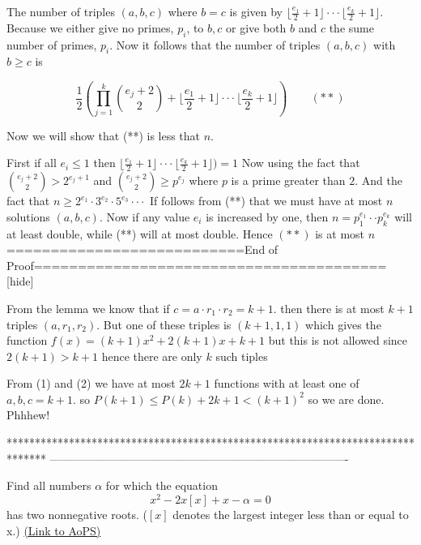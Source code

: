 \begin{solution}
The number of triples $(a,b,c)$ where $b=c$ is given by $\lfloor\frac{e_1}{2}+1\rfloor\cdot\cdot\cdot \lfloor\frac{e_k}{2}+1 \rfloor$. Because we either give no primes, $p_i$, to $b,c$ or give both $b$ and $c$ the sume number of primes, $p_i$. Now it follows that the number of triples $(a,b,c)$ with $b\ge c$ is

\[ \frac{1}{2}(\prod_{j=1}^k \binom{e_j+2}{2} + \lfloor \frac{e_1}{2}+1 \rfloor \cdot \cdot \cdot \lfloor\frac{e_k}{2}+1\rfloor) \qquad (**)\] 

Now we will show that (**) is less that $n$. 

First if all $e_i \le 1$ then ${\lfloor \frac{e_1}{2}+1\rfloor \cdot \cdot \cdot \lfloor\frac{e_k}{2}+1\rfloor})=1$
Now using the fact that $\binom{e_j+2}{2} > 2^{e_j+1}$ and $\binom{e_j+2}{2} \ge p^{e_j}$ where $p$ is a prime greater than $2$. And the fact that $n \ge 2^{e_1}\cdot 3^{e_2} \cdot 5^{e_3}\cdot\cdot\cdot$ If follows from (**) that we must have at most $n$ solutions $(a,b,c)$. Now if any value $e_i$ is increased by one, then $n=p_1^{e_1}\cdot\cdot p_k^{e_k}$ will at least double, while (**) will at most double. Hence $(**)$ is at most $n$
===========================End of Proof========================================
[\/hide]

From the lemma we know that if $c=a\cdot r_1\cdot r_2 = k+1$. then there is at most $k+1$ triples $(a,r_1,r_2)$. But one of these triples is $(k+1,1,1)$ which gives the function $f(x)=(k+1)x^2 + 2(k+1)x + k+1$ but this is not allowed since $2(k+1) > k+1$ hence there are only $k$ such tiples

From (1) and (2) we have at most $2k+1$ functions with at least one of $a,b,c=k+1$. so $P(k+1) \le P(k) + 2k+1 < (k+1)^2$ so we are done. Phhhew!
\end{solution}
*******************************************************************************
-------------------------------------------------------------------------------

\begin{problem}
	Find all numbers $\alpha$ for which the equation
\[x^2 - 2x[x] + x -\alpha = 0\]
has two nonnegative roots. ($[x]$ denotes the largest integer less than or equal to x.)
	\flushright \href{https://artofproblemsolving.com/community/c6h372232}{(Link to AoPS)}
\end{problem}



